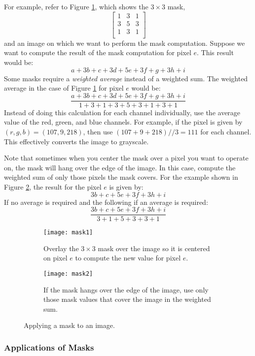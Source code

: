 \documentclass[addpoints]{exam}
\begin{document}
For example, refer to Figure \ref{fig:mask-full}, which shows the  $3 \times 3$ mask,
\[
  \left[
    \begin{array}{ccc}
      1 & 3 & 1\\
      3 & 5 & 3\\
      1 & 3 & 1\\
    \end{array}          
  \right]
\]
and an image on which we want to perform the mask computation. Suppose we want to compute the result of the mask computation for pixel $e$. This result would be:
\[
  a + 3b + c + 3d + 5e + 3f + g + 3h + i
\]
Some masks require a \textit{weighted average} instead of a weighted sum. The weighted average in the case of Figure \ref{fig:mask-full} for pixel $e$ would be:
\[
  \frac{a + 3b + c + 3d + 5e + 3f + g + 3h + i} {1 + 3 + 1 + 3 + 5 + 3 + 1 + 3 + 1}
\]
Instead of doing this calculation for each channel individually, use the average value of the red, green, and blue channels. For example, if the pixel is given by $(r, g, b) = (107, 9, 218)$, then use $(107 + 9 + 218)//3 = 111$ for each channel. This effectively converts the image to grayscale.

Note that sometimes when you center the mask over a pixel you want to operate on, the mask will hang over the edge of the image. In this case, compute the weighted sum of only those pixels the mask covers. For the example shown in Figure \ref{fig:mask-hang}, the result for the pixel $e$ is given by:
\[
  3b + c + 5e + 3f + 3h + i
\]
If no average is required and the following if an average is required:
\[
  \frac{3b + c + 5e + 3f + 3h + i}{3+1+5+3+3+1}
\]

\begin{figure}
  \centering
  \begin{subfigure}{.48\textwidth}
    \texttt{[image: mask1]}
    \caption{Overlay the $3 \times 3$ mask over the image so it is centered on pixel $e$ to compute the new value for pixel $e$.}\label{fig:mask-full}
  \end{subfigure}
  \begin{subfigure}[c]{.48\textwidth}
    \texttt{[image: mask2]}
    \caption{If the mask hangs over the edge of the image, use only those mask values that cover the image in the weighted sum.}\label{fig:mask-hang}
  \end{subfigure}
  \caption{Applying a mask to an image.}
  \label{fig:mask}
\end{figure}

\subsubsection{Applications of Masks}
\end{document}
